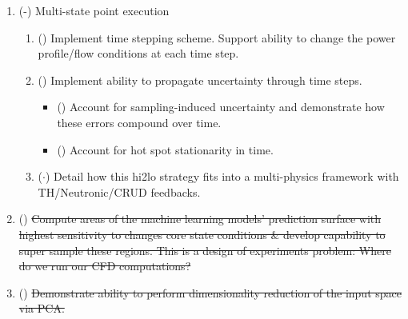 \begin{enumerate}
\begin{enumerate}
\begin{enumerate}
        \end{enumerate}
        \item (\checkmark-) Multi-state point execution
        \begin{enumerate}
            \item (\checkmark) Implement time stepping scheme.  Support ability to change the power profile/flow conditions at each time step.
            \item (\checkmark) Implement ability to propagate uncertainty through time steps.
            \begin{itemize}
                \item (\checkmark) Account for sampling-induced uncertainty and demonstrate how these errors compound over time.
                \item (\checkmark) {\color{blue} Account for hot spot stationarity in time.}

            \end{itemize}
        \item ($\cdot$) {\color{blue} Detail how this hi2lo strategy fits into a multi-physics framework with TH/Neutronic/CRUD feedbacks.}
        \end{enumerate}
        \item (\xmark) \sout{Compute areas of the machine learning models' prediction surface with highest
                             sensitivity to changes core state conditions \& develop capability to super sample these regions.  This is a design of experiments problem: Where do we run our CFD computations?}
        \item (\xmark) \sout{Demonstrate ability to perform dimensionality reduction of the input space via PCA.}

    \end{enumerate}


\end{enumerate}
